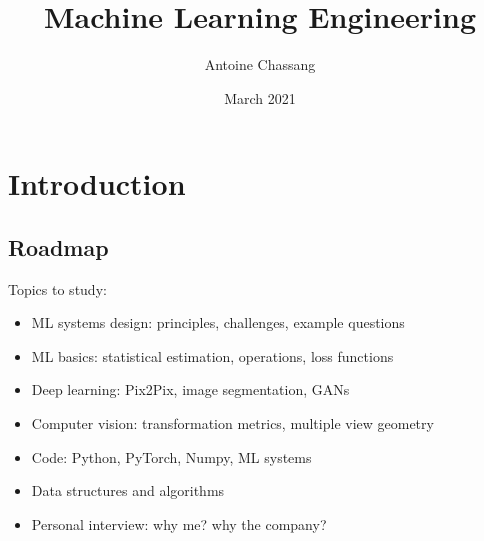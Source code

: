 \documentclass{report}
\title{Machine Learning Engineering}
\author{Antoine Chassang}
\date{March 2021}
\begin{document}
\maketitle
\tableofcontents

\chapter{Introduction}
\section{Roadmap}
Topics to study:
\begin{itemize}
    \item ML systems design: principles, challenges, example questions
    \item ML basics: statistical estimation, operations, loss functions
    \item Deep learning: Pix2Pix, image segmentation, GANs
    \item Computer vision: transformation metrics, multiple view geometry
    \item Code: Python, PyTorch, Numpy, ML systems
    \item Data structures and algorithms
    \item Personal interview: why me? why the company?
\end{itemize}










\end{document}
